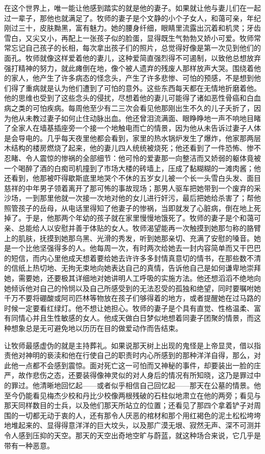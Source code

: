     在这个世界上，唯一能让他感到踏实的就是他的妻子。如果就让他与妻儿们在一起过一辈子，那他也就满足了。牧师的妻子是个文静的小个子女人，和蔼可亲，年纪刚过三十，皮肤黝黑，富有魅力。她的腰身纤细，眼睛里流露出沉着和机灵；牙齿雪白，又尖又小，再配上一张孩子似的脸蛋，显得既生气勃勃又娇小可爱。牧师常常忘记自己孩子的长相，每次拿出孩子们的照片，总觉得好像是第一次见到他们的面孔。牧师就像这样爱着他的妻儿，这种爱简直强烈得不可遏制，以致他总想放弃强打精神的努力，就此瘫倒在地，像个被人遗弃的残废人那样放声大哭。围绕着他的家人，他产生了许多病态的怪念头，产生了许多悲惨、可怕的预感，不是想到他们得了重病就是认为他们遭到了可怕的意外。这些东西每天都在无情地折磨着他。他的思维也受到了这些念头的侵扰，尽想着他的妻儿可能得了诸如恶性骨癌和白血病之类的可怕疾病。每周他至少有二三次会看见他那刚出生不久的儿子夭折了，因为他从未教过妻子如何止住动脉出血。他还曾泪流满面、眼睁睁地一声不响地目睹了全家人在墙基插座旁一个接一个地触电而亡的情景，因为他从未告诉过妻子人体是会导电的。几乎每天夜里他都会看到，家里的热水锅炉发生了爆炸，他家那两层木结构的楼房燃烧了起来，他的妻儿四人统统被烧死；他还看到了一件恐怖、惨不忍睹、令人震惊的惨祸的全部细节：他可怜的爱妻那一向整洁而又娇弱的躯体竟被一个喝醉了酒的白痴司机撞到了市场大楼的砖墙上，压成了黏糊糊的一滩肉酱；他还看到，他那被吓得歇斯底里地哭个不休的五岁女儿被一个长一头雪白头发、面目慈祥的中年男子领着离开了那可怖的事故现场；那男人驱车把她带到一个废弃的采沙场，一到那里他就一次接一次地对他的女儿进行奸污，最后把她给杀害了；帮他照管孩子的岳母，从电话里得知了他妻子的惨祸，当即就发了心脏病，倒在地上死掉了。于是，他那两个年幼的孩子就在家里慢慢地饿死了。牧师的妻子是个和蔼可亲、总能给人以安慰并善于体贴的女人。牧师渴望能再一次触摸到她那匀称的胳臂上的肌肤，抚摸到她那乌黑、光滑的秀发，听到她那亲切、充满了安慰的嗓音。她是一个比他坚强得多的人。他每周一次，有时两次给她去一封内容简单而又干巴巴的短信，而内心里他成天想着要给她去许许多多封情真意切的情书，在那些数不清的信纸上热切地、无拘无束地向她表达自己的真情，告诉他自己是如何谦卑地崇拜她，需要她，还要极其详细地对她讲明人工呼吸的实施方法。他还想滔滔不绝地向她倾诉他对自己的怜悯以及自己所感受到的无法忍受的孤独和绝望，同时要嘱咐她千万不要将硼酸或阿司匹林等物放在孩子们够得着的地方，或者提醒她在过马路的时候一定要看红绿灯。他不想让她担心。牧师的妻子是个具有直觉、性格温柔、富有同情心并且生性敏感的女人。他成天做白日梦似地想着同妻子团聚的情景，而这种想象总是无可避免地以历历在目的做爱动作而告结束。
 


    让牧师最感虚伪的就是主持葬礼。如果说那天树上出现的鬼怪是上帝显灵，借以指责他对神明的亵渎和他在行使自己的职责时内心所感到的那种洋洋自得，那么，对此他一点都不会感到震惊。面对死亡这一可怕而又神秘的事件，却要装出一脸的庄严，故作悲伤之态，还要装得像神灵似的对人身后的情况有所知晓，这乃是罪过中的罪过。他清晰地回忆起——或者似乎相信自己回忆起——那天在公墓的情景。他至今仍能看见梅杰少校和丹比少校像两根残破的石柱似地肃立在他的两旁；看见与那天同样数目的士兵，以及他们那天所站立的位置；还看见了那四个拿着铲子对周围的一切都无动于衷的人，还有那令人厌恶的棺材和那个用红褐色的泥土松松垮垮地堆起来的、显得得意洋洋的巨大坟头，以及那广漠无垠、寂然无声、深不可测并令人感到压抑的天空。那天的天空出奇地空旷与蔚蓝，就这种场合来说，它几乎是带有一种恶意。

